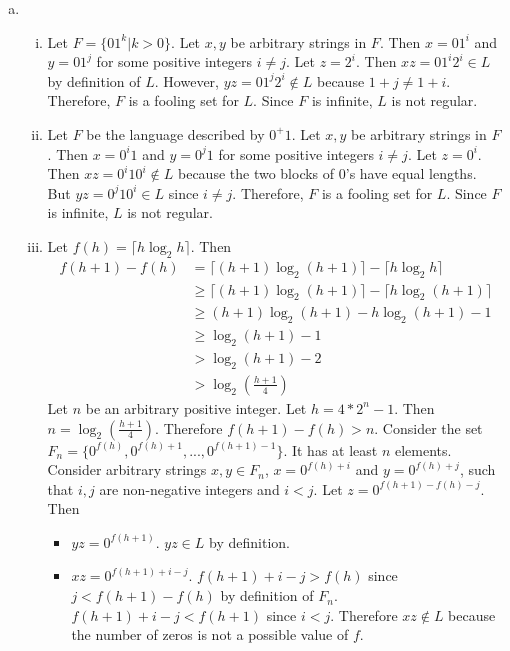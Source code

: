 \documentclass[11pt]{article}
\begin{document}



\begin{solution}
\begin{enumerate}[(a)]
\item
\begin{enumerate}[i.]
\item
Let $F=\{ 01^k | k > 0 \}$. Let $x,y$ be arbitrary strings in $F$. Then $x=01^i$ and $y=01^j$ for some positive integers $i\neq j$. Let $z=2^i$. Then $xz=01^i2^i\in L$ by definition of $L$. However, $yz=01^j2^i \notin L$ because $1+j\neq 1+i$. Therefore, $F$ is a fooling set for $L$. Since $F$ is infinite, $L$ is not regular.
\item
Let $F$ be the language described by $0^+1$. Let $x,y$ be arbitrary strings in $F$. Then $x=0^i1$ and $y=0^j1$ for some positive integers $i\neq j$. Let $z=0^i$. Then $xz=0^i10^i\notin L$ because the two blocks of $0$'s have equal lengths. But $yz=0^j10^i\in L$ since $i\neq j$. Therefore, $F$ is a fooling set for $L$. Since $F$ is infinite, $L$ is not regular.
\item
Let $f(h)=\lceil h\log_{2}{h}\rceil$. Then
\begin{align*}
f(h+1)-f(h)&=\lceil (h+1)\log_{2}{(h+1)}\rceil - \lceil h\log_{2}{h}\rceil \\
&\geq \lceil (h+1)\log_{2}{(h+1)}\rceil - \lceil h\log_{2}{(h+1)}\rceil\\
&\geq (h+1)\log_{2}{(h+1)} - h\log_{2}{(h+1)} - 1\\
&\geq \log_{2}{(h+1)} - 1\\
&> \log_{2}{(h+1)} - 2\\
&> \log_{2}{(\frac{h+1}{4})}
\end{align*}
Let $n$ be an arbitrary positive integer. Let $h = 4*2^n - 1$. Then $n=\log_{2}{(\frac{h+1}{4})}$. Therefore $f(h+1) - f(h) > n$. Consider the set $F_n=\{0^{f(h)}, 0^{f(h)+1}, ..., 0^{f(h+1)-1}\}$. It has at least $n$ elements.\\
Consider arbitrary strings $x,y\in F_n$, $x=0^{f(h)+i}$ and $y=0^{f(h)+j}$, such that $i,j$ are non-negative integers and $i<j$. Let $z=0^{f(h+1)-f(h)-j}$. Then
\begin{itemize}
\item $yz=0^{f(h+1)}$. $yz\in L$ by definition.
\item $xz=0^{f(h+1)+i-j}$. $f(h+1)+i-j > f(h)$ since $j<f(h+1)-f(h)$ by definition of $F_n$. $f(h+1)+i-j < f(h+1)$ since $i<j$. Therefore $xz\notin L$ because the number of zeros is not a possible value of $f$.

\end{itemize}
\end{enumerate}
\end{enumerate}
\end{solution}
\end{document}
